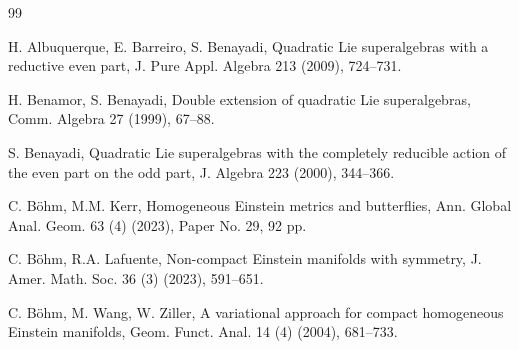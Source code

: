 \documentclass[reqno]{amsart}
\theoremstyle{definition}
\begin{document}

\begin{thebibliography}{99}



 H. Albuquerque, E. Barreiro, S. Benayadi, Quadratic Lie superalgebras with a reductive even part, J. Pure Appl. Algebra 213 (2009), 724--731.



 H. Benamor, S. Benayadi, Double extension of quadratic Lie superalgebras, Comm. Algebra 27 (1999), 67--88.

 S. Benayadi, Quadratic Lie superalgebras with the completely reducible action of the even part on the odd part, J. Algebra 223 (2000),  344--366.



 C. B\"{o}hm, M.M. Kerr, Homogeneous Einstein metrics and butterflies, Ann. Global Anal. Geom. 63 (4) (2023), Paper No. 29, 92 pp.


 C. B\"{o}hm,  R.A.  Lafuente, Non-compact Einstein manifolds with symmetry, J. Amer. Math. Soc. 36 (3) (2023), 591--651.

 C. B\"{o}hm, M. Wang, W. Ziller, A variational approach for compact homogeneous Einstein manifolds, Geom. Funct. Anal. 14 (4) (2004),  681--733.


\end{thebibliography}
\end{document}
